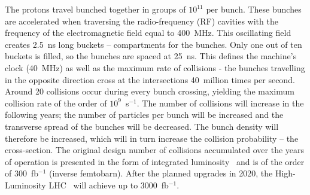 The protons travel bunched together in groups of $10^{11}$ per bunch. These bunches are accelerated when traversing the radio-frequency (RF) cavities with the frequency of the electromagnetic field equal to 400~MHz. This oscillating field creates 2.5~ns long buckets -- compartments for the bunches. Only one out of ten buckets is filled, so the bunches are spaced at 25~ns. This defines the machine's clock (40~MHz) as well as the maximum rate of collisions - the bunches travelling in the opposite direction cross at the intersections 40~million times per second. Around 20 collisions occur during every bunch crossing, yielding the maximum collision rate of the order of $10^9$~s$^{-1}$. The number of collisions will increase in the following years; the number of particles per bunch will be increased and the transverse spread of the bunches will be decreased. The bunch density will therefore be increased, which will in turn increase the collision probability -- the cross-section. The original design number of collisions accumulated over the years of operation is presented in the form of integrated luminosity~\cite{Herr:1625184} and is of the order of 300~fb$^{-1}$ (inverse femtobarn). After the planned upgrades in 2020, the High-Luminosity LHC~\cite{BejarAlonso:2069130} will achieve up to 3000~fb$^{-1}$.

